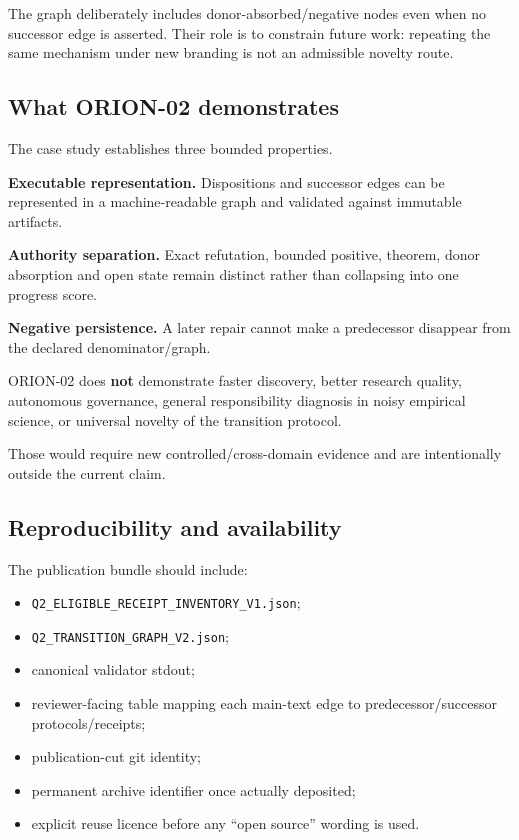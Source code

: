 \documentclass[preprint,12pt]{elsarticle}
\providecommand{\tightlist}{%
  \setlength{\itemsep}{0pt}\setlength{\parskip}{0pt}}
\begin{document}
The graph deliberately includes donor-absorbed/negative nodes even when
no successor edge is asserted. Their role is to constrain future work:
repeating the same mechanism under new branding is not an admissible
novelty route.

\hypertarget{what-orion-02-demonstrates}{%
\subsection{What ORION-02
demonstrates}\label{what-orion-02-demonstrates}}

The case study establishes three bounded properties.

\textbf{Executable representation.} Dispositions and successor edges can
be represented in a machine-readable graph and validated against
immutable artifacts.

\textbf{Authority separation.} Exact refutation, bounded positive,
theorem, donor absorption and open state remain distinct rather than
collapsing into one progress score.

\textbf{Negative persistence.} A later repair cannot make a predecessor
disappear from the declared denominator/graph.

ORION-02 does \textbf{not} demonstrate faster discovery, better research
quality, autonomous governance, general responsibility diagnosis in
noisy empirical science, or universal novelty of the transition
protocol.

Those would require new controlled/cross-domain evidence and are
intentionally outside the current claim.

\hypertarget{reproducibility-and-availability}{%
\subsection{Reproducibility and
availability}\label{reproducibility-and-availability}}

The publication bundle should include:

\begin{itemize}
\tightlist
\item
  \texttt{Q2\_ELIGIBLE\_RECEIPT\_INVENTORY\_V1.json};
\item
  \texttt{Q2\_TRANSITION\_GRAPH\_V2.json};
\item
  canonical validator stdout;
\item
  reviewer-facing table mapping each main-text edge to
  predecessor/successor protocols/receipts;
\item
  publication-cut git identity;
\item
  permanent archive identifier once actually deposited;
\item
  explicit reuse licence before any ``open source'' wording is used.
\end{itemize}
\end{document}
